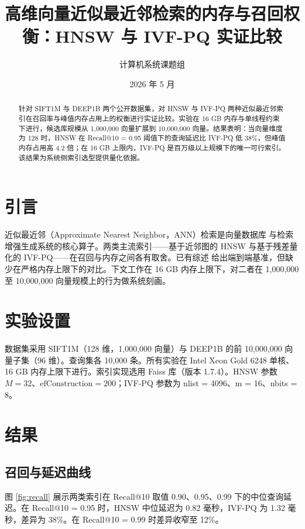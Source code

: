 \documentclass[zihao=-4,UTF8]{ctexart}
\title{高维向量近似最近邻检索的内存与召回权衡：HNSW 与 IVF-PQ 实证比较}
\author{计算机系统课题组}
\date{2026 年 5 月}
\begin{document}
\maketitle

\begin{abstract}
针对 SIFT1M 与 DEEP1B 两个公开数据集，对 HNSW \cite{malkov2018hnsw} 与 IVF-PQ \cite{jegou2011pq} 两种近似最近邻索引在召回率与峰值内存占用上的权衡进行实证比较。实验在 16 GB 内存与单线程约束下进行，候选库规模从 1,000,000 向量扩展到 10,000,000 向量。结果表明：当向量维度为 128 时，HNSW 在 Recall@10 = 0.95 阈值下的查询延迟比 IVF-PQ 低 38\%，但峰值内存占用高 4.2 倍；在 16 GB 上限内，IVF-PQ 是百万级以上规模下的唯一可行索引。该结果为系统侧索引选型提供量化依据。
\end{abstract}

\section{引言}
\label{sec:intro}
近似最近邻（Approximate Nearest Neighbor，ANN）检索是向量数据库 \cite{johnson2019faiss} 与检索增强生成系统的核心算子。两类主流索引——基于近邻图的 HNSW 与基于残差量化的 IVF-PQ——在召回与内存之间各有取舍。已有综述 \cite{aumuller2020annbench} 给出端到端基准，但缺少在严格内存上限下的对比。下文工作在 16 GB 内存上限下，对二者在 1,000,000 至 10,000,000 向量规模上的行为做系统刻画。

\section{实验设置}
\label{sec:setup}
数据集采用 SIFT1M（128 维，1,000,000 向量）与 DEEP1B 的前 10,000,000 向量子集（96 维）。查询集各 10,000 条。所有实验在 Intel Xeon Gold 6248 单核、16 GB 内存上限下进行。索引实现选用 Faiss 库（版本 1.7.4）\cite{johnson2019faiss}。HNSW 参数 $M = 32$、$\mathrm{efConstruction} = 200$；IVF-PQ 参数为 nlist = 4096、m = 16、nbits = 8。

\section{结果}
\label{sec:result}

\subsection{召回与延迟曲线}
\label{subsec:recall}
图 \ref{fig:recall} 展示两类索引在 Recall@10 取值 0.90、0.95、0.99 下的中位查询延迟。在 Recall@10 = 0.95 时，HNSW 中位延迟为 0.82 毫秒，IVF-PQ 为 1.32 毫秒，差异为 38\%。在 Recall@10 = 0.99 时差异收窄至 12\%。
\end{document}
